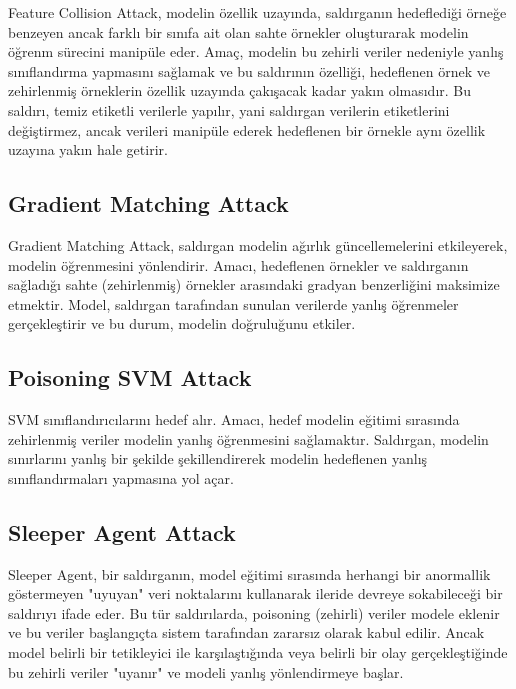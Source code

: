 Feature Collision Attack, modelin özellik uzayında, saldırganın hedeflediği örneğe benzeyen ancak farklı bir sınıfa ait olan sahte örnekler oluşturarak modelin öğrenm sürecini manipüle eder. Amaç, modelin bu zehirli veriler nedeniyle yanlış sınıflandırma yapmasını sağlamak ve bu saldırının özelliği, hedeflenen örnek ve zehirlenmiş örneklerin özellik uzayında çakışacak kadar yakın olmasıdır. Bu saldırı, temiz etiketli verilerle yapılır, yani saldırgan verilerin etiketlerini değiştirmez, ancak verileri manipüle ederek hedeflenen bir örnekle aynı özellik uzayına yakın hale getirir.

\newpage

\subsection{Gradient Matching Attack}

Gradient Matching Attack, saldırgan modelin ağırlık güncellemelerini etkileyerek, modelin öğrenmesini yönlendirir. Amacı, hedeflenen örnekler ve saldırganın sağladığı sahte (zehirlenmiş) örnekler arasındaki gradyan benzerliğini maksimize etmektir. Model, saldırgan tarafından sunulan verilerde yanlış öğrenmeler gerçekleştirir ve bu durum, modelin doğruluğunu etkiler.

\newpage

\subsection{Poisoning SVM Attack}

SVM sınıflandırıcılarını hedef alır. Amacı, hedef modelin eğitimi sırasında zehirlenmiş veriler modelin yanlış öğrenmesini sağlamaktır. Saldırgan, modelin sınırlarını yanlış bir şekilde şekillendirerek modelin hedeflenen yanlış sınıflandırmaları yapmasına yol açar. 

\newpage

\subsection{Sleeper Agent Attack}

Sleeper Agent, bir saldırganın, model eğitimi sırasında herhangi bir anormallik göstermeyen "uyuyan" veri noktalarını kullanarak ileride devreye sokabileceği bir saldırıyı ifade eder. Bu tür saldırılarda, poisoning (zehirli) veriler modele eklenir ve bu veriler başlangıçta sistem tarafından zararsız olarak kabul edilir. Ancak model belirli bir tetikleyici ile karşılaştığında veya belirli bir olay gerçekleştiğinde bu zehirli veriler "uyanır" ve modeli yanlış yönlendirmeye başlar.

\newpage